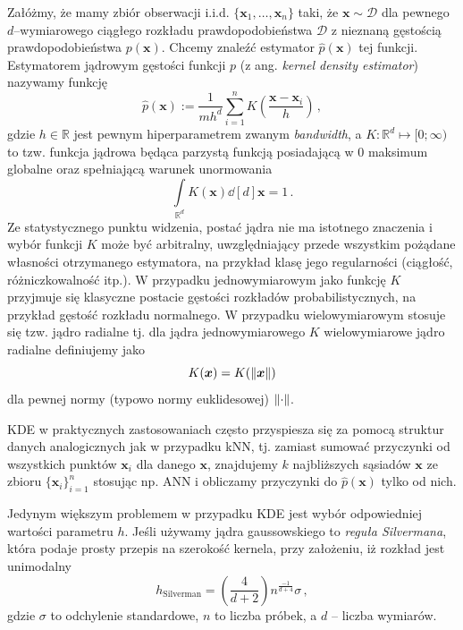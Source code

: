 \documentclass{myclass}
\numberwithin{equation}{subsection}
\begin{document}
Załóżmy, że mamy zbiór obserwacji i.i.d. \(\{\bm{x}_1, \ldots, \bm{x}_n\}\) taki, że \(\bm{x} \sim
\mathcal{D}\) dla pewnego \(d\)--wymiarowego ciągłego rozkładu prawdopodobieństwa \(\mathcal{D}\) z
nieznaną gęstością prawdopodobieństwa \(p(\bm{x})\). Chcemy znaleźć estymator \(\hat{p}(\bm{x})\)
tej funkcji. Estymatorem jądrowym gęstości funkcji \(p\) (z ang. \textit{kernel density estimator})
nazywamy funkcję
\begin{equation}\boxed{
    \hat{p}(\bm{x}) := \frac{1}{mh^d}\sum_{i=1}^n K\left(\frac{\bm{x} - \bm{x}_i}{h}\right)\,,
}\end{equation}
gdzie \(h \in \mathbb{R}\) jest pewnym hiperparametrem zwanym \textit{bandwidth}, a \(K:
\mathbb{R}^d \mapsto [0; \infty)\) to tzw. funkcja jądrowa będąca parzystą funkcją posiadającą w 0
maksimum globalne oraz spełniającą warunek unormowania
\begin{equation}
    \int\limits_{\mathbb{R}^d} K(\bm{x}) \dd[d]{\bm{x}}= 1\,.
\end{equation}
Ze statystycznego punktu widzenia, postać jądra nie ma istotnego znaczenia i wybór funkcji  \(K\)
może być arbitralny, uwzględniający przede wszystkim pożądane własności otrzymanego estymatora, na
przykład klasę jego regularności (ciągłość, różniczkowalność itp.). W przypadku jednowymiarowym jako
funkcję \(K\) przyjmuje się klasyczne postacie gęstości rozkładów probabilistycznych, na przykład
gęstość rozkładu normalnego. W przypadku wielowymiarowym stosuje się tzw. jądro radialne tj. dla
jądra jednowymiarowego \(K\) wielowymiarowe jądro radialne definiujemy jako
\begin{equation}
    K(\bm{x}) = K(\norm{\bm{x}})
\end{equation}
dla pewnej normy (typowo normy euklidesowej) \(\norm{\cdot}\).

KDE w praktycznych zastosowaniach często przyspiesza się za pomocą struktur danych analogicznych jak
w przypadku kNN, tj. zamiast sumować przyczynki od wszystkich punktów \(\bm{x}_i\) dla danego
\(\bm{x}\), znajdujemy \(k\) najbliższych sąsiadów \(\bm{x}\) ze zbioru \(\{\bm{x}_i\}_{i=1}^n\)
stosując np. ANN i obliczamy przyczynki do \(\hat{p}(\bm{x})\) tylko od nich.

Jedynym większym problemem w przypadku KDE jest wybór odpowiedniej wartości parametru \(h\). Jeśli
używamy jądra gaussowskiego to \emph{reguła Silvermana}, która podaje prosty przepis na szerokość
kernela, przy założeniu, iż rozkład jest unimodalny
\begin{equation}
    h_\mathrm{Silverman} = \left(\frac{4}{d + 2}\right)n^{\frac{-1}{d + 4}}\sigma\,,
\end{equation}
gdzie \(\sigma\) to odchylenie standardowe, \(n\) to liczba próbek, a \(d\) -- liczba wymiarów.
\end{document}
